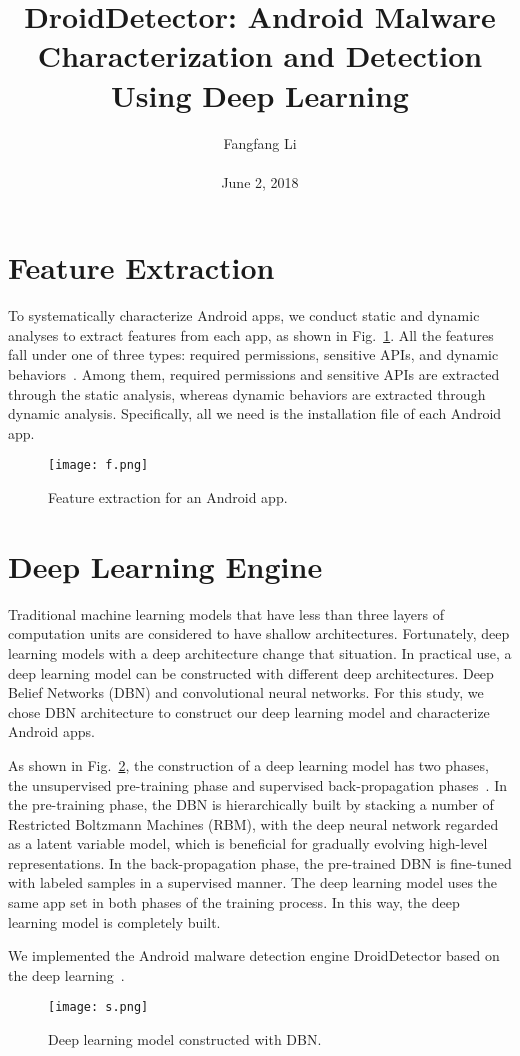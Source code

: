 \documentclass[10pt,twocolumn,letterpaper]{article}
\title{\textbf{DroidDetector: Android Malware Characterization and Detection Using Deep Learning}}
\author{Fangfang Li\\\\June 2, 2018}
\begin{document}
\maketitle
\section{Feature Extraction}
To systematically characterize Android apps, we conduct static and dynamic analyses to extract features from each app, as shown in Fig.~\ref{1}. All the features fall under one of three types: required permissions, sensitive APIs, and dynamic behaviors~\cite{goodfellow2016deep}. Among them, required permissions and sensitive APIs are extracted through the static analysis, whereas dynamic behaviors are extracted through dynamic analysis. Specifically, all we need is the installation file of each Android app.
\begin{figure}[htbp]
\begin{center}

\texttt{[image: f.png]}
\end{center}
 \caption{Feature extraction for an Android app.}
\label{1}

\end{figure}
\section{Deep Learning Engine}
Traditional machine learning models that have less than three layers of computation units are considered to have shallow architectures. Fortunately, deep learning models with a deep architecture change that situation. In practical use, a deep learning model can be constructed with different deep architectures. Deep Belief Networks (DBN) and convolutional neural networks. For this study, we chose DBN architecture to construct our deep learning model and characterize Android apps.

As shown in Fig.~\ref{2}, the construction of a deep learning model has two phases, the unsupervised pre-training phase and supervised back-propagation phases~\cite{schmidhuber2015deep}. In the pre-training phase, the DBN is hierarchically built by stacking a number of Restricted Boltzmann Machines (RBM), with the deep neural network regarded as a latent variable model, which is beneficial for gradually evolving high-level representations. In the back-propagation phase, the pre-trained DBN is fine-tuned with labeled samples in a supervised manner. The deep learning model uses the same app set in both phases of the training process. In this way, the deep learning model is completely built.
\par
We implemented the Android malware detection engine DroidDetector based on the deep learning~\cite{krizhevsky2012imagenet}.
\begin{figure}[htbp]
\begin{center}

\texttt{[image: s.png]}
\end{center}
 \caption{Deep learning model constructed with DBN.}
\label{2}

\end{figure}

{\small


}
\end{document}
